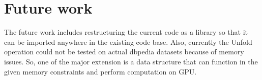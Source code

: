 \documentclass{article}
\begin{document}
\section*{Future work}
The future work includes restructuring the current code as a library so that it can be imported anywhere in the existing code base. Also, currently the Unfold operation could not be tested on actual dbpedia datasets because of memory issues. So, one of the major extension is a data structure that can function in the given memory constraints and perform computation on GPU.
\end{document}
